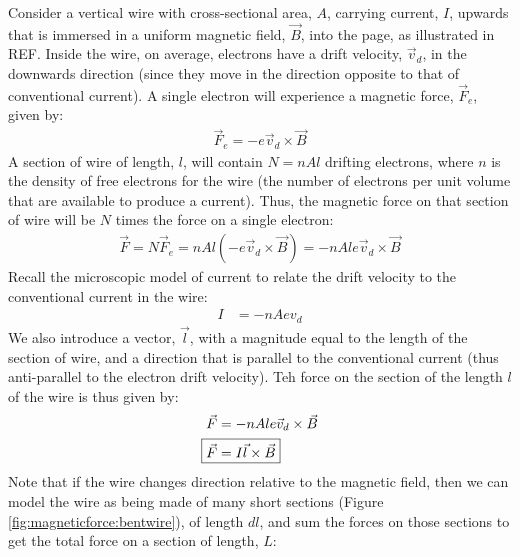 Consider a vertical wire with cross-sectional area, $A$, carrying current, $I$, upwards that is immersed in a uniform magnetic field, $\vec B$, into the page, as illustrated in REF. Inside the wire, on average, electrons have a drift velocity, $\vec v_d$, in the downwards direction (since they move in the direction opposite to that of conventional current).
A single electron will experience a magnetic force, $\vec F_e$, given by:
\begin{align*}
\vec F_e = -e \vec v_d \times \vec B
\end{align*}
A section of wire of length, $l$, will contain $N=nAl$ drifting electrons, where $n$ is the density of free electrons for the wire (the number of electrons per unit volume that are available to produce a current). Thus, the magnetic force on that section of wire will be $N$ times the force on a single electron:
\begin{align*}
\vec F = N\vec F_e = nAl (-e \vec v_d \times \vec B)=-nAle \vec v_d \times \vec B
\end{align*}
Recall the microscopic model of current to relate the drift velocity to the conventional current in the wire:
\begin{align*}
I &= -nAev_d
\end{align*}
We also introduce a vector, $\vec l$, with a magnitude equal to the length of the section of wire, and a direction that is parallel to the conventional current (thus anti-parallel to the electron drift velocity). Teh force on the section of the length $l$ of the wire is thus given by:
\begin{align*}
\vec F &= -nAle \vec v_d \times \vec B\\
\Aboxed{ \vec F&= I \vec l \times \vec B}
\end{align*}
Note that if the wire changes direction relative to the magnetic field, then we can model the wire as being made of many short sections (Figure \ref{fig:magneticforce:bentwire}), of length $dl$, and sum the forces on those sections to get the total force on a section of length, $L$:

